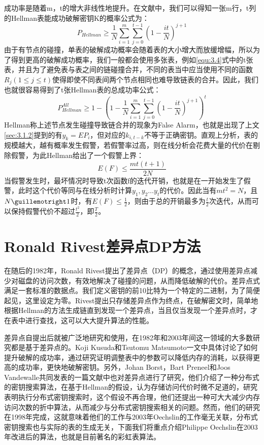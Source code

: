 成功率是随着m，t的增大非线性地提升。在文献\cite{hellman}中，我们可以得知一张m行，t列的Hellman表能成功破解密钥K的概率公式为：
\begin{equation}
P_{Hellman}\geq \frac{1}{N}\sum_{i=1}^{m}\sum_{j=0}^{t-1}\left(1-\frac{it}{N}\right)^{j+1}
\label{equ:3.7}
\end{equation}
由于有节点的碰撞，单表的破解成功概率会随着表的大小增大而放缓增幅，所以为了得到更高的破解成功概率，我们一般都会使用多张表，例如\eqref{equ:3.4}式中的t张表，并且为了避免表与表之间的链碰撞合并，不同的表当中应当使用不同的函数$R_j(1\leq j \leq t)$使得即使不同表间两个节点相同也难导致链表的合并。因此，我们也就很容易得到了t张Hellman表的总成功率公式：
\begin{equation}
\boxed{P_{Hellman}^{All}\geq 1-\left(1-\frac{1}{N}\sum_{i=1}^{m}\sum_{j=0}^{t-1}\left(1-\frac{it}{N}\right)^{j+1}\right)^t}
\end{equation}
Hellman称上述节点发生碰撞导致链合并的现象为False Alarm，也就是出现了上文\ref{sec:3.1.2}提到的有$y_k=EP_i$，但对应的$k_{i,t-k}$不等于正确密钥。直观上分析，表的规模越大，越有概率发生假警，若假警率过高，则在线分析会花费大量的代价在剔除假警，为此Hellman给出了一个假警上界：
\begin{equation}
E(F)\leq \frac{mt(t+1)}{2N}
\end{equation}
当假警发生时，最坏情况时导致t次函数f的迭代开销，也就是在一开始发生了假警，此时这个代价等同与在线分析时计算$y_1,y_2\ldots y_t$的代价。因此当有$mt^2=N$，且$N\guillemotright 1$时，有$E(F)\leq \frac{1}{2}$，则由于总的开销最多为$\frac{t}{2}$次迭代，从而可以保持假警代价不超过$\frac{t^2}{2}$，即$\frac{T}{2}$。
\section{Ronald Rivest差异点DP方法}
\label{sec:3.2}
在随后的1982年，Ronald Rivest提出了差异点（DP）的概念，通过使用差异点减少对磁盘的访问次数，有效地解决了碰撞的问题，从而降低破解的代价。差异点式满足一套标准的数据点。我们定义密钥的前10比特为一个特定的二进制，为了简便起见，这里设定为零。Rivest提出只存储差异点作为终点，在破解密文时，简单地根据Hellman的方法生成链直到发现一个差异点，当且仅当发现一个差异点时，才在表中进行查找，这可以大大提升算法的性能。

差异点自提出后就被广泛地研究和使用，在1982年和2003年间这一领域的大多数研究都是基于差异点的。Koji Kusuda和Tsutomu Matsumoto\cite{koji}一文中具体讨论了如何提升破解的成功率，通过研究证明调整表中的参数可以降低内存的消耗，以获得更高的成功率，更快地破解密钥。另外，Johan Borst，Bart Preneel和Joos Vandewalle\cite{jbj}共同发表的一篇文献中也对差异点进行了研究，他们介绍了一种分布式的密钥搜索算法，在基于Hellman的假设，认为存储访问代价时微不足道的，研究表明执行分布式密钥搜索时，这个假设不再合理，他们还提出一种可大大减少内存访问次数的折中算法，从而减少与分布式密钥搜索相关的问题。然而，他们的研究在1998年完成，这就意味着他们的工作与2003年Oechslin的工作毫无关联，分布式密钥搜索也与实际的表的生成无关，下面我们将重点介绍Philippe Oechslin在2003年改进后的算法，也就是目前著名的彩虹表算法。
